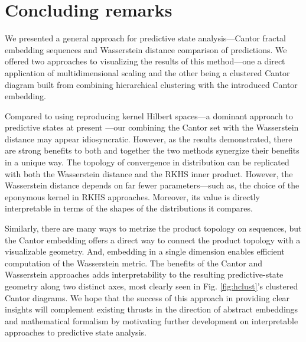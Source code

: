 \documentclass[draft,aps,pre,twocolumn,groupaddress,showkeys,nofootinbib,preprintnumbers,floatfix]{revtex4-2}
\begin{document}
\section{Concluding remarks}

We presented a general approach for predictive state analysis---Cantor fractal
embedding sequences and Wasserstein distance comparison of predictions. We
offered two approaches to visualizing the results of this method---one a direct
application of multidimensional scaling and the other being a clustered Cantor
diagram built from combining hierarchical clustering with the introduced Cantor
embedding.

Compared to using reproducing kernel Hilbert spaces---a dominant approach to
predictive states at present
\cite{Song09a,Song10a,Boot13a,Brod20a,Loom21a}---our combining the Cantor set
with the Wasserstein distance may appear idiosyncratic. However, as the results
demonstrated, there are strong benefits to both and together the two methods
synergize their benefits in a unique way. The topology of convergence in
distribution can be replicated with both the Wasserstein distance and the RKHS
inner product. However, the Wasserstein distance depends on far fewer
parameters---such as, the choice of the eponymous kernel in RKHS approaches.
Moreover, its value is directly interpretable in terms of the shapes of the
distributions it compares.

Similarly, there are many ways to metrize the product topology on sequences, but
the Cantor embedding offers a direct way to connect the product topology with a
visualizable geometry. And, embedding in a single dimension enables efficient
computation of the Wasserstein metric. The benefits of the Cantor and
Wasserstein approaches adds interpretability to the resulting predictive-state
geometry along two distinct axes, most clearly seen in Fig. \ref{fig:hclust}'s
clustered Cantor diagrams. We hope that the success of this approach in
providing clear insights will complement existing thrusts in the direction of
abstract embeddings and mathematical formalism by motivating further development
on interpretable approaches to predictive state analysis.

\end{document}
